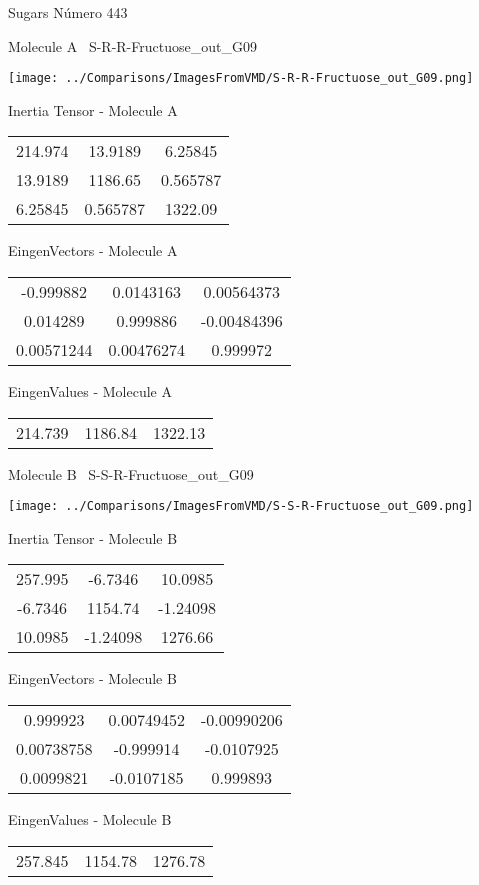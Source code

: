 \vtab[-3cm]
\begin{center}
{\large Sugars \tab Número 443}
\end{center}
\begin{multicols}{2}
\begin{center}

Molecule A \
S-R-R-Fructuose\_out\_G09

\texttt{[image: ../Comparisons/ImagesFromVMD/S-R-R-Fructuose\_out\_G09.png]}

Inertia Tensor - Molecule A \\
\begin{tabular}{|c c c|}
214.974	 & 	13.9189	 & 	6.25845	 \\
13.9189	 & 	1186.65	 & 	0.565787	 \\
6.25845	 & 	0.565787	 & 	1322.09
\end{tabular}

\vtab
 EingenVectors - Molecule A     \\
\begin{tabular}{|c c c|}
-0.999882	 & 	0.0143163	 & 	0.00564373	 \\
0.014289	 & 	0.999886	 & 	-0.00484396	 \\
0.00571244	 & 	0.00476274	 & 	0.999972
\end{tabular}

\vtab
 EingenValues - Molecule A     \\
\begin{tabular}{|c c c|}
214.739	 & 	1186.84	 & 	1322.13	 \\
\end{tabular}
\columnbreak

Molecule B \
S-S-R-Fructuose\_out\_G09

\texttt{[image: ../Comparisons/ImagesFromVMD/S-S-R-Fructuose\_out\_G09.png]}

Inertia Tensor - Molecule B \\
\begin{tabular}{|c c c|}
257.995	 & 	-6.7346	 & 	10.0985	 \\
-6.7346	 & 	1154.74	 & 	-1.24098	 \\
10.0985	 & 	-1.24098	 & 	1276.66
\end{tabular}

\vtab
 EingenVectors - Molecule B     \\
\begin{tabular}{|c c c|}
0.999923	 & 	0.00749452	 & 	-0.00990206	 \\
0.00738758	 & 	-0.999914	 & 	-0.0107925	 \\
0.0099821	 & 	-0.0107185	 & 	0.999893
\end{tabular}

\vtab
 EingenValues - Molecule B     \\
\begin{tabular}{|c c c|}
257.845	 & 	1154.78	 & 	1276.78	 \\
\end{tabular}

\end{center}
\end{multicols}

